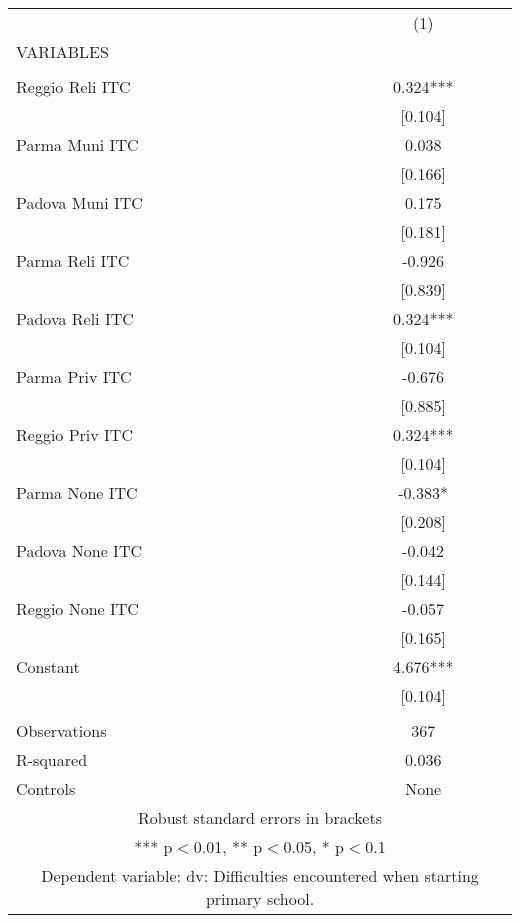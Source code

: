 \begin{tabular}{lc} \hline
 & (1) \\
VARIABLES &  \\ \hline
 &  \\
Reggio Reli ITC & 0.324*** \\
 & [0.104] \\
Parma Muni ITC & 0.038 \\
 & [0.166] \\
Padova Muni ITC & 0.175 \\
 & [0.181] \\
Parma Reli ITC & -0.926 \\
 & [0.839] \\
Padova Reli ITC & 0.324*** \\
 & [0.104] \\
Parma Priv ITC & -0.676 \\
 & [0.885] \\
Reggio Priv ITC & 0.324*** \\
 & [0.104] \\
Parma None ITC & -0.383* \\
 & [0.208] \\
Padova None ITC & -0.042 \\
 & [0.144] \\
Reggio None ITC & -0.057 \\
 & [0.165] \\
Constant & 4.676*** \\
 & [0.104] \\
 &  \\
Observations & 367 \\
R-squared & 0.036 \\
 Controls & None \\ \hline
\multicolumn{2}{c}{ Robust standard errors in brackets} \\
\multicolumn{2}{c}{ *** p$<$0.01, ** p$<$0.05, * p$<$0.1} \\
\multicolumn{2}{c}{ Dependent variable: dv: Difficulties encountered when starting primary school.} \\
\end{tabular}
